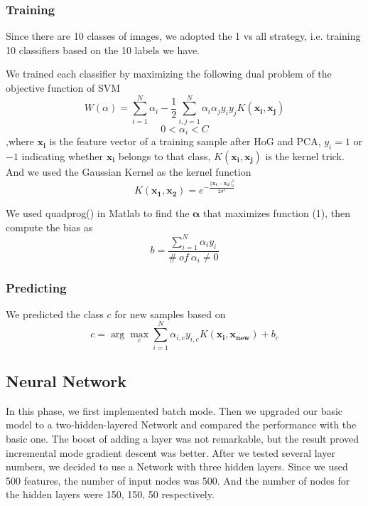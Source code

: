 \documentclass{article} %
\begin{document}
\subsubsection{Training}

Since there are 10 classes of images, we adopted the 1 vs all strategy, i.e. training 10 classifiers based on the 10 labels we have.

We trained each classifier by maximizing the following dual problem of the objective function of SVM
\begin{equation}
W(\alpha)=\sum_{i=1}^{N}\alpha_{i}-\frac{1}{2}\sum_{i,j=1}^{N}\alpha_{i}\alpha_{j}y_{i}y_{j}K(\mathbf{x_{i}},\mathbf{x_{j}})
\end{equation}
\begin{equation}
0<\alpha_{i}<C
\end{equation}
,where $\mathbf{x_{i}}$ is the feature vector of a training sample after HoG and PCA, $y_{i}=1$ or $-1$ indicating whether $\mathbf{x_{i}}$ belongs to that class, $K(\mathbf{x_{i}},\mathbf{x_{j}})$ is the kernel trick. And we used the Gaussian Kernel as the kernel function
\begin{equation}
K(\mathbf{x_{1}},\mathbf{x_{2}})=e^{-\frac{||\mathbf{x_{1}}-\mathbf{x_{2}}||^{2}_{2}}{2\sigma^{2}}}
\end{equation}

We used quadprog() in Matlab to find the $\mathbf{\alpha}$ that maximizes function (1), then compute the bias as
\begin{equation}
b=\frac{\sum_{i=1}^{N}\alpha_{i}y_{i}}{\#~of~\alpha_{i}\neq{0}}
\end{equation}

\subsubsection{Predicting}

We predicted the class $c$ for new samples based on
\begin{equation}
c=\arg\max_{c}\sum_{i=1}^{N}\alpha_{i,c}y_{i,c}K(\mathbf{x_{i}},\mathbf{x_{new}})+b_{c}
\end{equation}

\subsection{Neural Network}
In this phase, we first implemented batch mode. Then we upgraded our basic model to a two-hidden-layered Network and compared the performance with the basic one. The boost of adding a layer was not remarkable, but the result proved incremental mode gradient descent was better. After we tested several layer numbers, we decided to use a Network with three hidden layers. Since we used 500 features, the number of input nodes was 500. And the number of nodes for the hidden layers were 150, 150, 50 respectively.
\end{document}
